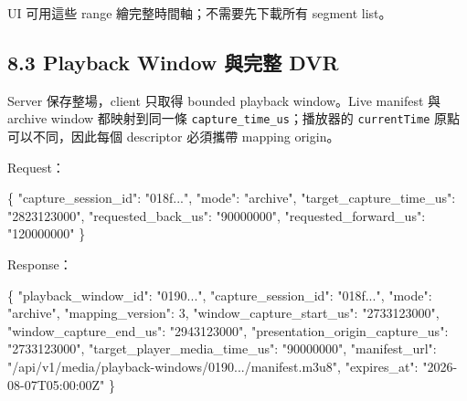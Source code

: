 \documentclass[
  9pt,
  a4paper,
]{article}
\newenvironment{Shaded}{}{}
\newcommand{\DataTypeTok}[1]{\textcolor[rgb]{0.56,0.13,0.00}{#1}}
\newcommand{\DecValTok}[1]{\textcolor[rgb]{0.25,0.63,0.44}{#1}}
\newcommand{\FunctionTok}[1]{\textcolor[rgb]{0.02,0.16,0.49}{#1}}
\newcommand{\StringTok}[1]{\textcolor[rgb]{0.25,0.44,0.63}{#1}}
\begin{document}
UI 可用這些 range 繪完整時間軸；不需要先下載所有 segment list。

\subsection{8.3 Playback Window 與完整
DVR}\label{83-playback-window-ux8207ux5b8cux6574-dvr}

Server 保存整場，client 只取得 bounded playback window。Live manifest 與
archive window 都映射到同一條 \texttt{capture\_\allowbreak{}time\_\allowbreak{}us}；播放器的
\texttt{currentTime} 原點可以不同，因此每個 descriptor 必須攜帶 mapping
origin。

Request：

\begin{Shaded}
\begin{Highlighting}[]
\FunctionTok{\{}
  \DataTypeTok{"capture\_\allowbreak{}session\_\allowbreak{}id"}\FunctionTok{:} \StringTok{"018f..."}\FunctionTok{,}
  \DataTypeTok{"mode"}\FunctionTok{:} \StringTok{"archive"}\FunctionTok{,}
  \DataTypeTok{"target\_\allowbreak{}capture\_\allowbreak{}time\_\allowbreak{}us"}\FunctionTok{:} \StringTok{"2823123000"}\FunctionTok{,}
  \DataTypeTok{"requested\_\allowbreak{}back\_\allowbreak{}us"}\FunctionTok{:} \StringTok{"90000000"}\FunctionTok{,}
  \DataTypeTok{"requested\_\allowbreak{}forward\_\allowbreak{}us"}\FunctionTok{:} \StringTok{"120000000"}
\FunctionTok{\}}
\end{Highlighting}
\end{Shaded}

Response：

\begin{Shaded}
\begin{Highlighting}[]
\FunctionTok{\{}
  \DataTypeTok{"playback\_\allowbreak{}window\_\allowbreak{}id"}\FunctionTok{:} \StringTok{"0190..."}\FunctionTok{,}
  \DataTypeTok{"capture\_\allowbreak{}session\_\allowbreak{}id"}\FunctionTok{:} \StringTok{"018f..."}\FunctionTok{,}
  \DataTypeTok{"mode"}\FunctionTok{:} \StringTok{"archive"}\FunctionTok{,}
  \DataTypeTok{"mapping\_\allowbreak{}version"}\FunctionTok{:} \DecValTok{3}\FunctionTok{,}
  \DataTypeTok{"window\_\allowbreak{}capture\_\allowbreak{}start\_\allowbreak{}us"}\FunctionTok{:} \StringTok{"2733123000"}\FunctionTok{,}
  \DataTypeTok{"window\_\allowbreak{}capture\_\allowbreak{}end\_\allowbreak{}us"}\FunctionTok{:} \StringTok{"2943123000"}\FunctionTok{,}
  \DataTypeTok{"presentation\_\allowbreak{}origin\_\allowbreak{}capture\_\allowbreak{}us"}\FunctionTok{:} \StringTok{"2733123000"}\FunctionTok{,}
  \DataTypeTok{"target\_\allowbreak{}player\_\allowbreak{}media\_\allowbreak{}time\_\allowbreak{}us"}\FunctionTok{:} \StringTok{"90000000"}\FunctionTok{,}
  \DataTypeTok{"manifest\_\allowbreak{}url"}\FunctionTok{:} \StringTok{"/api/v1/media/playback{-}windows/0190.../manifest.m3u8"}\FunctionTok{,}
  \DataTypeTok{"expires\_\allowbreak{}at"}\FunctionTok{:} \StringTok{"2026{-}08{-}07T05:00:00Z"}
\FunctionTok{\}}
\end{Highlighting}
\end{Shaded}
\end{document}
